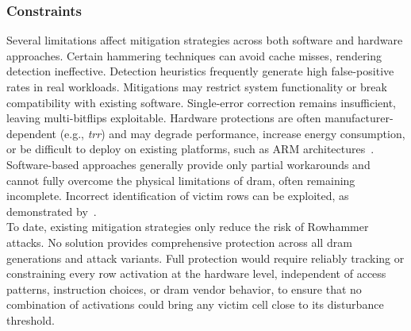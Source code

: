        \subsubsection{Constraints} \label{subsubsec:limitations-outspacing-refresh}
            Several limitations affect mitigation strategies across both software and hardware approaches. Certain hammering 
            techniques can avoid cache misses, rendering detection ineffective. Detection heuristics frequently generate high 
            false-positive rates in real workloads. Mitigations may restrict system functionality or break compatibility with 
            existing software. Single-error correction remains insufficient, leaving multi-bitflips exploitable. Hardware 
            protections are often manufacturer-dependent (e.g., \textit{\gls{trr}}) and may degrade performance, increase energy consumption, 
            or be difficult to deploy on existing platforms, such as ARM architectures~\cite{paperTriggeringRHHardwareFault}. Software-based approaches 
            generally provide only partial workarounds and cannot fully overcome the physical limitations of \gls{dram}, often remaining 
            incomplete. Incorrect identification of victim rows can be exploited, as demonstrated by~\cite{paperTRRespass,paperHalfDouble}.
            \\
            To date, existing mitigation strategies only reduce the risk of Rowhammer attacks. No solution provides 
            comprehensive protection across all \gls{dram} generations and attack variants. Full protection would require 
            reliably tracking or constraining every row activation at the hardware level, independent of access patterns, 
            instruction choices, or \gls{dram} vendor behavior, to ensure that no combination of activations could bring 
            any victim cell close to its disturbance threshold.

